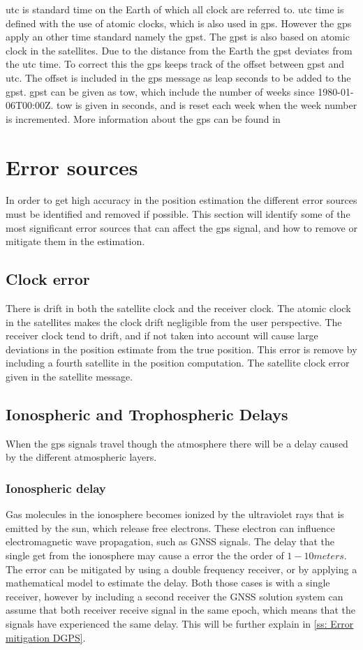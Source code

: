 \gls{utc} is standard time on the Earth of which all clock are referred to. \gls{utc} time is defined with the use of atomic clocks, which is also used in \gls{gps}. However the \gls{gps} apply an other time standard namely the \gls{gpst}. The \gls{gpst} is also based on atomic clock in the satellites. Due to the distance from the Earth the \gls{gpst} deviates from the \gls{utc} time. To correct this the \gls{gps} keeps track of the offset between \gls{gpst} and \gls{utc}. The offset is included in the \gls{gps} message as leap seconds to be added to the \gls{gpst}. \gls{gpst} can be given as \gls{tow}, which include the number of weeks since 1980-01-06T00:00Z. \gls{tow} is given in seconds, and is reset each week when the week number is incremented. More information about the \gls{gps} can be found in \citep{GPSBOOK,vik2014integrated} 
 
\section{Error sources}
In order to get high accuracy in the position estimation the different error sources must be identified and removed if possible. This section will identify some of the most significant error sources that can affect the \gls{gps} signal, and how to remove or mitigate them in the estimation.
\subsection{Clock error}
There is drift in both the satellite clock and the receiver clock. The atomic clock in the satellites makes the clock drift negligible from the user perspective. The receiver clock tend to drift, and if not taken into account will cause large deviations in the position estimate from the true position. This error is remove by including a fourth satellite in the position computation. The satellite clock error given in the satellite message. 

\subsection{Ionospheric and Trophospheric Delays}
When the \gls{gps} signals travel though the atmosphere there will be a delay caused by the different atmospheric layers.
\subsubsection{Ionospheric delay}
Gas molecules in the ionosphere becomes ionized by the ultraviolet rays that is emitted by the sun, which release free electrons. These electron can influence electromagnetic wave propagation, such as GNSS signals. The delay that the single get from the ionosphere may cause a error the the order of $1-10 meters$. The error can be mitigated by using a double frequency receiver, or by applying a mathematical model to estimate the delay. Both those cases is with a single receiver, however by including a second receiver the GNSS solution system can assume that both receiver receive signal in the same epoch, which means that the signals have experienced the same delay. This will be further explain in \ref{ss: Error mitigation DGPS}.

